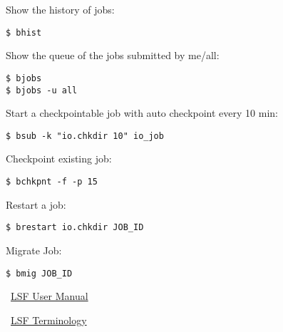 \documentclass[twocolumn,8pt]{article}
\begin{document}

\begin{mdframed}[frametitle=History]
Show the history of jobs:
\begin{lstlisting}
$ bhist
\end{lstlisting}

Show the queue of the jobs submitted by me/all:
\begin{lstlisting}
$ bjobs
$ bjobs -u all
\end{lstlisting}
\end{mdframed}


\begin{mdframed}[frametitle=Checkpoints and migrations]
Start a checkpointable job with auto checkpoint every 10 min:
\begin{lstlisting}
$ bsub -k "io.chkdir 10" io_job
\end{lstlisting}

Checkpoint existing job:
\begin{lstlisting}
$ bchkpnt -f -p 15
\end{lstlisting}

Restart a job:
\begin{lstlisting}
$ brestart io.chkdir JOB_ID
\end{lstlisting}

Migrate Job:
\begin{lstlisting}
$ bmig JOB_ID
\end{lstlisting}
\end{mdframed}



\begin{mdframed}[frametitle=Resources]
\faExternalLink\ \href{https://hpc.llnl.gov/banks-jobs/running-jobs/lsf-user-manual}{LSF User Manual}

\faExternalLink\ \href{https://www.ibm.com/support/knowledgecenter/SSWRJV_10.1.0/lsf_admin/terms.html}{LSF Terminology}
\vspace{3pt}
\end{mdframed}    
\end{document}
